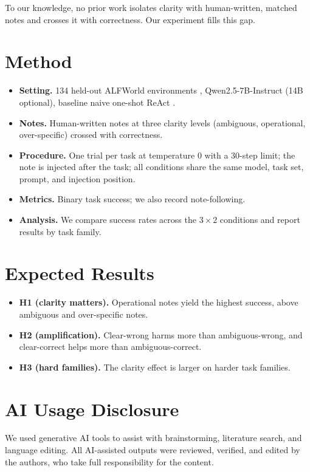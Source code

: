 To our knowledge, no prior work isolates clarity with human-written, matched notes and crosses it with correctness. Our experiment fills this gap.

\section{Method}

\begin{itemize}
\item \textbf{Setting.} 134 held-out ALFWorld environments \cite{alfworld}, Qwen2.5-7B-Instruct \cite{qwen25} (14B optional), baseline naive one-shot ReAct \cite{react}.
\item \textbf{Notes.} Human-written notes at three clarity levels (ambiguous, operational, over-specific) crossed with correctness.
\item \textbf{Procedure.} One trial per task at temperature 0 with a 30-step limit; the note is injected after the task; all conditions share the same model, task set, prompt, and injection position.
\item \textbf{Metrics.} Binary task success; we also record note-following.
\item \textbf{Analysis.} We compare success rates across the $3 \times 2$ conditions and report results by task family.
\end{itemize}

\section{Expected Results}

\begin{itemize}
\item \textbf{H1 (clarity matters).} Operational notes yield the highest success, above ambiguous and over-specific notes.
\item \textbf{H2 (amplification).} Clear-wrong harms more than ambiguous-wrong, and clear-correct helps more than ambiguous-correct.
\item \textbf{H3 (hard families).} The clarity effect is larger on harder task families.
\end{itemize}

\section{AI Usage Disclosure}

We used generative AI tools to assist with brainstorming, literature search, and language editing. All AI-assisted outputs were reviewed, verified, and edited by the authors, who take full responsibility for the content.
